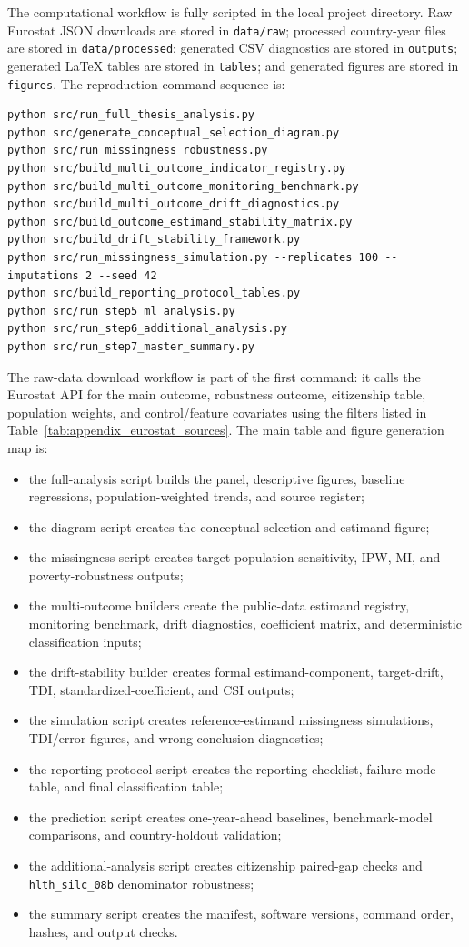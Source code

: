 The computational workflow is fully scripted in the local project directory. Raw Eurostat JSON downloads are stored in \texttt{data/raw}; processed country-year files are stored in \texttt{data/processed}; generated CSV diagnostics are stored in \texttt{outputs}; generated LaTeX tables are stored in \texttt{tables}; and generated figures are stored in \texttt{figures}. The reproduction command sequence is:
\begin{lstlisting}[basicstyle=\ttfamily\footnotesize,breaklines=true,columns=fullflexible]
python src/run_full_thesis_analysis.py
python src/generate_conceptual_selection_diagram.py
python src/run_missingness_robustness.py
python src/build_multi_outcome_indicator_registry.py
python src/build_multi_outcome_monitoring_benchmark.py
python src/build_multi_outcome_drift_diagnostics.py
python src/build_outcome_estimand_stability_matrix.py
python src/build_drift_stability_framework.py
python src/run_missingness_simulation.py --replicates 100 --imputations 2 --seed 42
python src/build_reporting_protocol_tables.py
python src/run_step5_ml_analysis.py
python src/run_step6_additional_analysis.py
python src/run_step7_master_summary.py
\end{lstlisting}
The raw-data download workflow is part of the first command: it calls the Eurostat API for the main outcome, robustness outcome, citizenship table, population weights, and control/feature covariates using the filters listed in Table~\ref{tab:appendix_eurostat_sources}. The main table and figure generation map is:
\begin{itemize}
    \item the full-analysis script builds the panel, descriptive figures, baseline regressions, population-weighted trends, and source register;
    \item the diagram script creates the conceptual selection and estimand figure;
    \item the missingness script creates target-population sensitivity, IPW, MI, and poverty-robustness outputs;
    \item the multi-outcome builders create the public-data estimand registry, monitoring benchmark, drift diagnostics, coefficient matrix, and deterministic classification inputs;
    \item the drift-stability builder creates formal estimand-component, target-drift, TDI, standardized-coefficient, and CSI outputs;
    \item the simulation script creates reference-estimand missingness simulations, TDI/error figures, and wrong-conclusion diagnostics;
    \item the reporting-protocol script creates the reporting checklist, failure-mode table, and final classification table;
    \item the prediction script creates one-year-ahead baselines, benchmark-model comparisons, and country-holdout validation;
    \item the additional-analysis script creates citizenship paired-gap checks and \texttt{hlth\_silc\_08b} denominator robustness;
    \item the summary script creates the manifest, software versions, command order, hashes, and output checks.
\end{itemize}
